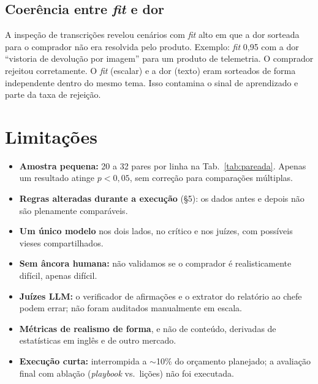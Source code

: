 \documentclass[11pt,a4paper]{article}
\begin{document}
\subsection{Coerência entre \emph{fit} e dor}
A inspeção de transcrições revelou cenários com \emph{fit} alto em que a dor sorteada para o comprador não era resolvida pelo produto. Exemplo: \emph{fit} 0,95 com a dor ``vistoria de devolução por imagem'' para um produto de telemetria. O comprador rejeitou corretamente. O \emph{fit} (escalar) e a dor (texto) eram sorteados de forma independente dentro do mesmo tema. Isso contamina o sinal de aprendizado e parte da taxa de rejeição.

\section{Limitações}
\begin{itemize}
  \item \textbf{Amostra pequena:} 20 a 32 pares por linha na Tab.~\ref{tab:pareada}. Apenas um resultado atinge $p<0{,}05$, sem correção para comparações múltiplas.
  \item \textbf{Regras alteradas durante a execução} (\S5): os dados antes e depois não são plenamente comparáveis.
  \item \textbf{Um único modelo} nos dois lados, no crítico e nos juízes, com possíveis vieses compartilhados.
  \item \textbf{Sem âncora humana:} não validamos se o comprador é realisticamente difícil, apenas difícil.
  \item \textbf{Juízes LLM:} o verificador de afirmações e o extrator do relatório ao chefe podem errar; não foram auditados manualmente em escala.
  \item \textbf{Métricas de realismo de forma}, e não de conteúdo, derivadas de estatísticas em inglês e de outro mercado.
  \item \textbf{Execução curta:} interrompida a $\sim$10\% do orçamento planejado; a avaliação final com ablação (\emph{playbook} vs.\ lições) não foi executada.
\end{itemize}
\end{document}
